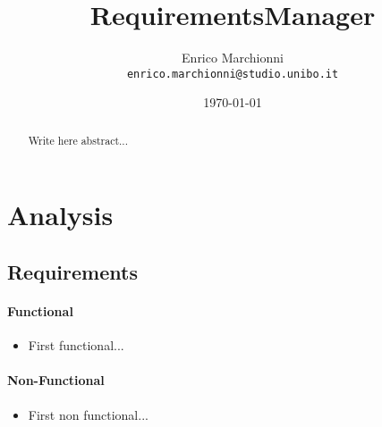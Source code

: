 \documentclass[12pt, a4paper]{report}
\title{
    RequirementsManager
}
\author{
    Enrico Marchionni\\
    \texttt{enrico.marchionni@studio.unibo.it}
}
\date{\today}
\begin{document}
\maketitle

\begin{abstract}

    Write here abstract...

\end{abstract}

\tableofcontents

\chapter{Analysis}

\section{Requirements}

\subsubsection{Functional}

\begin{itemize}
    \item First functional...
\end{itemize}

\subsubsection{Non-Functional}

\begin{itemize}
    \item First non functional...
\end{itemize}

\appendix

\end{document}
